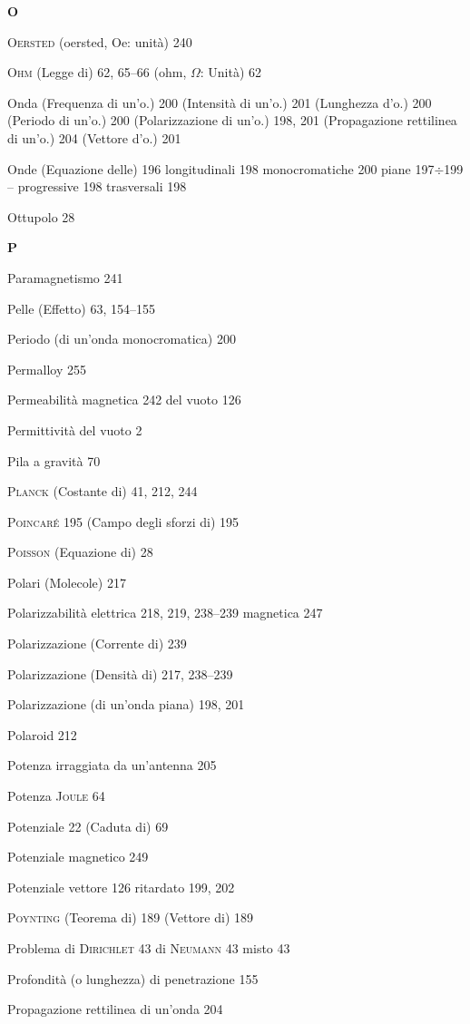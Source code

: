 \begin{theindex}
  \indexspace
  \item \textbf{O}
  \indexspace
  \item \textsc{Oersted} (oersted, Oe: unit\`a) 240
  \item \textsc{Ohm} (Legge di) 62, 65--66
    \subitem (ohm, $\Omega$: Unit\`a) 62
  \item Onda
    \subitem (Frequenza di un'o.) 200
    \subitem (Intensit\`a di un'o.) 201
    \subitem (Lunghezza d'o.) 200
    \subitem (Periodo di un'o.) 200
    \subitem (Polarizzazione di un'o.) 198, 201
    \subitem (Propagazione rettilinea di un'o.) 204
    \subitem (Vettore d'o.) 201
  \item Onde (Equazione delle) 196
    \subitem longitudinali 198
    \subitem monocromatiche 200
    \subitem piane 197$\div$199
    \subitem -- progressive 198
    \subitem trasversali 198
  \item Ottupolo 28

  \indexspace
  \item \textbf{P}
  \indexspace
  \item Paramagnetismo 241
  \item Pelle (Effetto) 63, 154--155
  \item Periodo (di un'onda monocromatica) 200
  \item Permalloy 255
  \item Permeabilit\`a magnetica 242
    \subitem del vuoto 126
  \item Permittivit\`a del vuoto 2
  \item Pila a gravit\`a 70
  \item \textsc{Planck} (Costante di) 41, 212, 244
  \item \textsc{Poincar\'e} 195
    \subitem (Campo degli sforzi di) 195
  \item \textsc{Poisson} (Equazione di) 28
  \item Polari (Molecole) 217
  \item Polarizzabilit\`a
    \subitem elettrica 218, 219, 238--239
    \subitem magnetica 247
  \item Polarizzazione (Corrente di) 239
  \item Polarizzazione (Densit\`a di) 217, 238--239
  \item Polarizzazione (di un'onda piana) 198, 201
  \item Polaroid 212
  \item Potenza irraggiata da un'antenna 205
  \item Potenza \textsc{Joule} 64
  \item Potenziale 22
    \subitem (Caduta di) 69
  \item Potenziale magnetico 249
  \item Potenziale vettore 126
    \subitem ritardato 199, 202
  \item \textsc{Poynting} (Teorema di) 189
    \subitem (Vettore di) 189
  \item Problema di \textsc{Dirichlet} 43
    \subitem di \textsc{Neumann} 43
    \subitem misto 43
  \item Profondit\`a (o lunghezza) di penetrazione 155
  \item Propagazione rettilinea di un'onda 204


\end{theindex}
